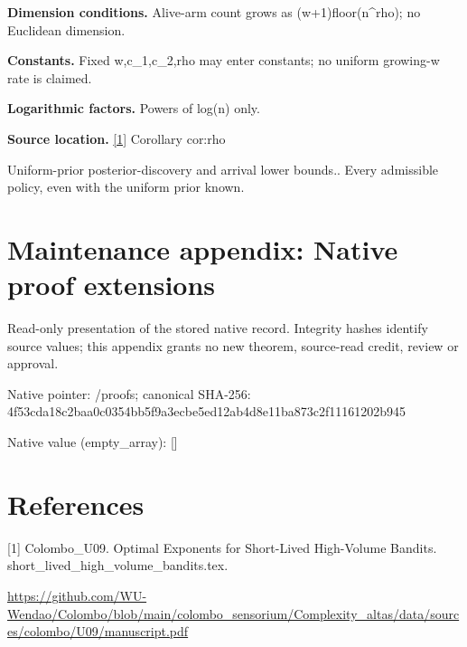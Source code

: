 \documentclass[10pt,a4paper]{article}
\begin{document}
\textbf{Dimension conditions.} Alive-arm count grows as (w+1)floor(n\textasciicircum{}rho); no Euclidean dimension.



\textbf{Constants.} Fixed w,c\_1,c\_2,rho may enter constants; no uniform growing-w rate is claimed.



\textbf{Logarithmic factors.} Powers of log(n) only.



\textbf{Source location.} \href{https://github.com/WU-Wendao/Colombo/blob/main/colombo_sensorium/Complexity_altas/data/sources/colombo/U09/manuscript.pdf}{[1]} Corollary cor:rho



Uniform-prior posterior-discovery and arrival lower bounds.. Every admissible policy, even with the uniform prior known.



\section{Maintenance appendix: Native proof extensions}


Read-only presentation of the stored native record. Integrity hashes identify source values; this appendix grants no new theorem, source-read credit, review or approval.



Native pointer: /proofs; canonical SHA-256: 4f53cda18c2baa0c0354bb5f\allowbreak{}9a3ecbe5ed12ab4d8e11ba87\allowbreak{}3c2f11161202b945



Native value (empty\_array): []



\section{References}


[1] Colombo\_U09. Optimal Exponents for Short-Lived High-Volume Bandits. short\_lived\_high\_volume\_bandits.tex.



\url{https://github.com/WU-Wendao/Colombo/blob/main/colombo_sensorium/Complexity_altas/data/sources/colombo/U09/manuscript.pdf}
\end{document}
